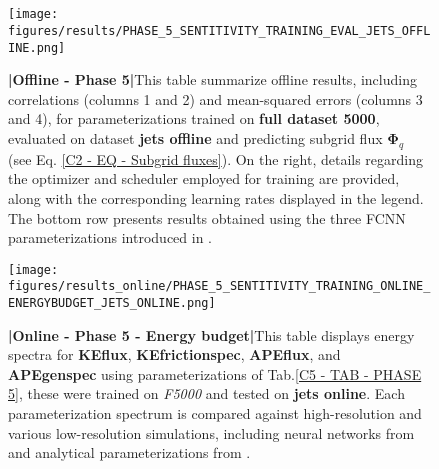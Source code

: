 %
%
\newpage
\thispagestyle{empty}
\part{}
\newpage

\begin{figure}[H]
    \centering
    \texttt{[image: figures/results/PHASE\_5\_SENTITIVITY\_TRAINING\_EVAL\_JETS\_OFFLINE.png]}
    \caption{\textbf{|}\textcolor{section_color}{\textbf{Offline - Phase 5}}\textbf{|}This table summarize offline results, including correlations (columns 1 and 2) and mean-squared errors (columns 3 and 4), for parameterizations trained on \textbf{full dataset 5000}, evaluated on dataset \textbf{jets offline} and predicting subgrid flux $\mathbf{\Phi}_q$ (see Eq. \ref{C2 - EQ - Subgrid fluxes}). On the right, details regarding the optimizer and scheduler employed for training are provided, along with the corresponding learning rates displayed in the legend. The bottom row presents results obtained using the three FCNN parameterizations introduced in \cite{Benchmarking}.}
    \label{APP - OFFLINE - PHASE 5 - SENSITIVITY TRAINING - JETS OFFLINE}
\end{figure}

%
%
\newpage

\begin{figure}[H]
    \centering
    \texttt{[image: figures/results\_online/PHASE\_5\_SENTITIVITY\_TRAINING\_ONLINE\_ENERGYBUDGET\_JETS\_ONLINE.png]}
    \caption{\textbf{|}\textcolor{section_color}{\textbf{Online - Phase 5 - Energy budget}}\textbf{|}This table displays energy spectra for \textbf{KEflux}, \textbf{KEfrictionspec}, \textbf{APEflux}, and \textbf{APEgenspec} using parameterizations of Tab.\ref{C5 - TAB - PHASE 5}, these were trained on \textit{F5000} and tested on \textbf{jets online}. Each parameterization spectrum is compared against high-resolution and various low-resolution simulations, including neural networks from \cite{Benchmarking} and analytical parameterizations from \cite{ClosureAnalytical2, ClosureAnalytical51, ClosureDataDrivenZanna}.
}
    \label{APP - ONLINE - PHASE 5 - ENERGY BUDGET -  FULL 5000 and JETS ONLINE}
\end{figure}

